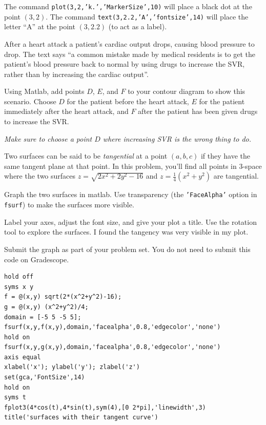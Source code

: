 \documentclass[12pt,letterpaper,noanswers]{exam}
\begin{document}
\begin{questions}
\begin{parts}
The command \texttt{plot(3,2,'k.','MarkerSize',10)} will place a black dot at the point $(3,2)$.  The command \texttt{text(3,2.2,'A','fontsize',14)} will place the letter ``A'' at the point $(3,2.2)$ (to act as a label).

\item After a heart attack a patient's cardiac output drops, causing blood pressure to drop.  The text says ``a common mistake made by medical residents is to get the patient's blood pressure back to normal by using drugs to increase the SVR, rather than by increasing the cardiac output''.  

Using Matlab, add points $D$, $E$, and $F$ to your contour diagram to show this scenario.  Choose $D$ for the patient before the heart attack, $E$ for the patient immediately after the heart attack, and $F$ after the patient has been given drugs to increase the SVR.

\emph{Make sure to choose a point $D$ where increasing SVR is the wrong thing to do.}
\end{parts}


\question Two surfaces can be said to be \emph{tangential} at a point $(a,b,c)$ if they have the same tangent plane at that point.  In this problem, you'll find all points in $3$-space where the two surfaces $z = \sqrt{2x^2+2y^2-16}$ and $z = \frac{1}{4}(x^2+y^2)$ are tangential.
\begin{parts}
\item Graph the two surfaces in matlab.  Use transparency (the \texttt{'FaceAlpha'} option in \texttt{fsurf}) to make the surfaces more visible.

Label your axes, adjust the font size, and give your plot a title.  Use the rotation tool to explore the surfaces.  I found the tangency was very visible in my plot.

Submit the graph as part of your problem set.  You do not need to submit this code on Gradescope.
\begin{solution}
\begin{verbatim}
hold off
syms x y
f = @(x,y) sqrt(2*(x^2+y^2)-16);
g = @(x,y) (x^2+y^2)/4;
domain = [-5 5 -5 5];
fsurf(x,y,f(x,y),domain,'facealpha',0.8,'edgecolor','none')
hold on
fsurf(x,y,g(x,y),domain,'facealpha',0.8,'edgecolor','none')
axis equal
xlabel('x'); ylabel('y'); zlabel('z')
set(gca,'FontSize',14)
hold on
syms t
fplot3(4*cos(t),4*sin(t),sym(4),[0 2*pi],'linewidth',3)
title('surfaces with their tangent curve')
\end{verbatim}


\end{solution}
\end{parts}
\end{questions}
\end{document}
